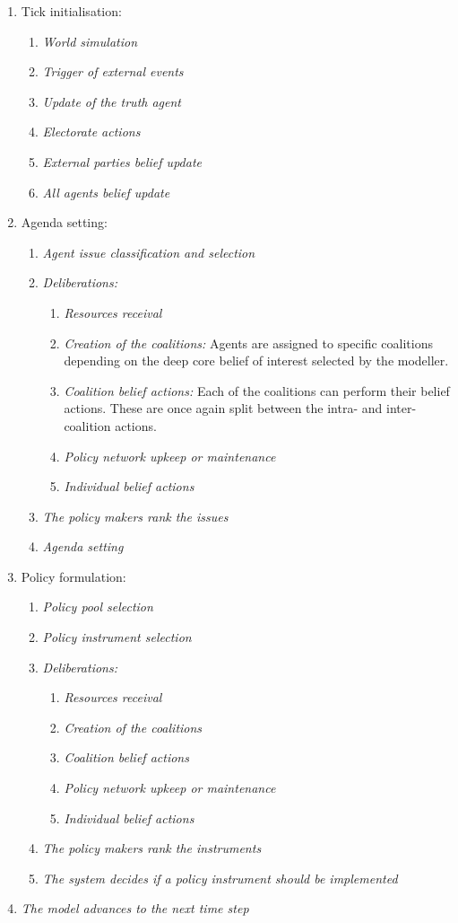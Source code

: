 \begin{enumerate}
\item Tick initialisation:
	\begin{enumerate}
	\item \emph{World simulation}
	\item \emph{Trigger of external events}
	\item \emph{Update of the truth agent}
	\item \emph{Electorate actions}
	\item \emph{External parties belief update}
	\item \emph{All agents belief update}
	\end{enumerate}
\item Agenda setting:
	\begin{enumerate}
	\item \emph{Agent issue classification and selection}
	\item \emph{Deliberations:}
		\begin{enumerate}
		\item \emph{Resources receival}
		\item \emph{Creation of the coalitions:} Agents are assigned to specific coalitions depending on the deep core belief of interest selected by the modeller.
		\item \emph{Coalition belief actions:} Each of the coalitions can perform their belief actions. These are once again split between the intra- and inter-coalition actions.
		\item \emph{Policy network upkeep or maintenance}
		\item \emph{Individual belief actions}
		\end{enumerate}
	\item \emph{The policy makers rank the issues}
	\item \emph{Agenda setting}
	\end{enumerate}
\item Policy formulation:
	\begin{enumerate}
	\item \emph{Policy pool selection}
	\item \emph{Policy instrument selection}
	\item \emph{Deliberations:}
		\begin{enumerate}
		\item \emph{Resources receival}
		\item \emph{Creation of the coalitions}
		\item \emph{Coalition belief actions}
		\item \emph{Policy network upkeep or maintenance}
		\item \emph{Individual belief actions}
		\end{enumerate}
	\item \emph{The policy makers rank the instruments}
	\item \emph{The system decides if a policy instrument should be implemented}
	\end{enumerate}
\item \emph{The model advances to the next time step}
\end{enumerate}
